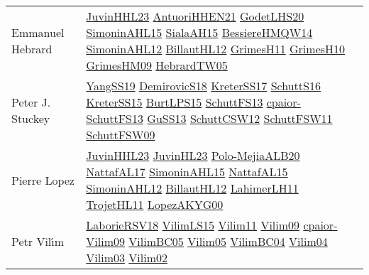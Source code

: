 {\begin{longtable}{p{4cm}p{20cm}}
Emmanuel Hebrard & \href{papers/JuvinHHL23.pdf}{JuvinHHL23}\cite{JuvinHHL23} \href{papers/AntuoriHHEN21.pdf}{AntuoriHHEN21}\cite{AntuoriHHEN21} \href{papers/GodetLHS20.pdf}{GodetLHS20}\cite{GodetLHS20} \href{articles/SimoninAHL15.pdf}{SimoninAHL15}\cite{SimoninAHL15} \href{papers/SialaAH15.pdf}{SialaAH15}\cite{SialaAH15} \href{papers/BessiereHMQW14.pdf}{BessiereHMQW14}\cite{BessiereHMQW14} \href{papers/SimoninAHL12.pdf}{SimoninAHL12}\cite{SimoninAHL12} \href{papers/BillautHL12.pdf}{BillautHL12}\cite{BillautHL12} \href{papers/GrimesH11.pdf}{GrimesH11}\cite{GrimesH11} \href{papers/GrimesH10.pdf}{GrimesH10}\cite{GrimesH10} \href{papers/GrimesHM09.pdf}{GrimesHM09}\cite{GrimesHM09} \href{papers/HebrardTW05.pdf}{HebrardTW05}\cite{HebrardTW05} \\
Peter J. Stuckey & \href{papers/YangSS19.pdf}{YangSS19}\cite{YangSS19} \href{papers/DemirovicS18.pdf}{DemirovicS18}\cite{DemirovicS18} \href{articles/KreterSS17.pdf}{KreterSS17}\cite{KreterSS17} \href{papers/SchuttS16.pdf}{SchuttS16}\cite{SchuttS16} \href{papers/KreterSS15.pdf}{KreterSS15}\cite{KreterSS15} \href{papers/BurtLPS15.pdf}{BurtLPS15}\cite{BurtLPS15} \href{papers/SchuttFS13.pdf}{SchuttFS13}\cite{SchuttFS13} \href{papers/cpaior-SchuttFS13.pdf}{cpaior-SchuttFS13}\cite{cpaior-SchuttFS13} \href{papers/GuSS13.pdf}{GuSS13}\cite{GuSS13} \href{papers/SchuttCSW12.pdf}{SchuttCSW12}\cite{SchuttCSW12} \href{articles/SchuttFSW11.pdf}{SchuttFSW11}\cite{SchuttFSW11} \href{papers/SchuttFSW09.pdf}{SchuttFSW09}\cite{SchuttFSW09} \\
Pierre Lopez & \href{papers/JuvinHHL23.pdf}{JuvinHHL23}\cite{JuvinHHL23} \href{papers/JuvinHL23.pdf}{JuvinHL23}\cite{JuvinHL23} \href{}{Polo-MejiaALB20}\cite{Polo-MejiaALB20} \href{articles/NattafAL17.pdf}{NattafAL17}\cite{NattafAL17} \href{articles/SimoninAHL15.pdf}{SimoninAHL15}\cite{SimoninAHL15} \href{articles/NattafAL15.pdf}{NattafAL15}\cite{NattafAL15} \href{papers/SimoninAHL12.pdf}{SimoninAHL12}\cite{SimoninAHL12} \href{papers/BillautHL12.pdf}{BillautHL12}\cite{BillautHL12} \href{papers/LahimerLH11.pdf}{LahimerLH11}\cite{LahimerLH11} \href{articles/TrojetHL11.pdf}{TrojetHL11}\cite{TrojetHL11} \href{articles/LopezAKYG00.pdf}{LopezAKYG00}\cite{LopezAKYG00} \\
Petr Vil{\'{\i}}m & \href{articles/LaborieRSV18.pdf}{LaborieRSV18}\cite{LaborieRSV18} \href{papers/VilimLS15.pdf}{VilimLS15}\cite{VilimLS15} \href{papers/Vilim11.pdf}{Vilim11}\cite{Vilim11} \href{papers/Vilim09.pdf}{Vilim09}\cite{Vilim09} \href{papers/cpaior-Vilim09.pdf}{cpaior-Vilim09}\cite{cpaior-Vilim09} \href{articles/VilimBC05.pdf}{VilimBC05}\cite{VilimBC05} \href{papers/Vilim05.pdf}{Vilim05}\cite{Vilim05} \href{papers/VilimBC04.pdf}{VilimBC04}\cite{VilimBC04} \href{papers/Vilim04.pdf}{Vilim04}\cite{Vilim04} \href{papers/Vilim03.pdf}{Vilim03}\cite{Vilim03} \href{papers/Vilim02.pdf}{Vilim02}\cite{Vilim02} \\

\end{longtable}}
